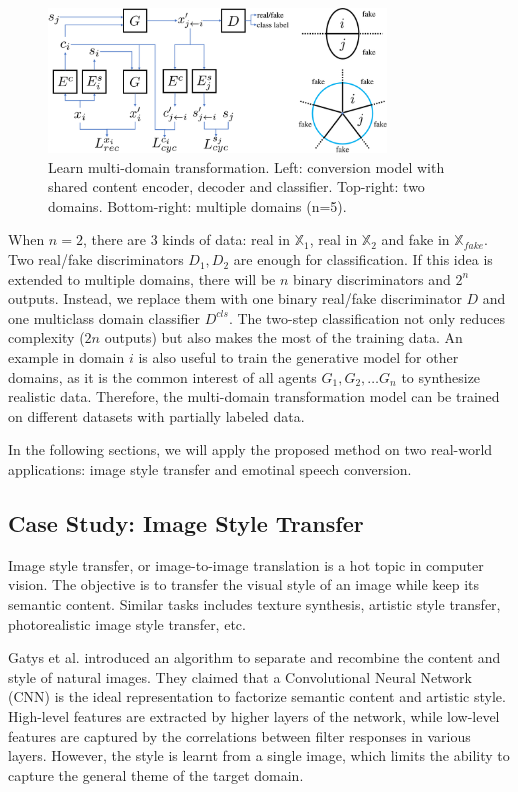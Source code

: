 \documentclass{article}
\begin{document}
\begin{figure}[htb]
\center
\includegraphics[width=0.8\textwidth]{FIG/multi}
\caption{Learn multi-domain transformation. Left: conversion model with shared content encoder, decoder and classifier. Top-right: two domains. Bottom-right: multiple domains (n=5).}
\label{fig:multi}
\end{figure}

When $n=2$, there are 3 kinds of data: real in $\mathbb{X}_1$, real in $\mathbb{X}_2$ and fake in $\mathbb{X}_{fake}$. Two real/fake discriminators $D_1,D_2$ are enough for classification.
If this idea is extended to multiple domains, there will be $n$ binary discriminators and $2^n$ outputs. Instead, we replace them with one binary real/fake discriminator $D$ and one multiclass domain classifier $D^{cls}$. The two-step classification not only reduces complexity ($2n$ outputs) but also makes the most of the training data. An example in domain $i$ is also useful to train the generative model for other domains, as it is the common interest of all agents $G_1, G_2, \ldots G_n$ to synthesize realistic data. Therefore, the multi-domain transformation model can be trained on different datasets with partially labeled data.

In the following sections, we will apply the proposed method on two real-world applications: image style transfer and emotinal speech conversion.


\subsection{Case Study: Image Style Transfer}
Image style transfer, or image-to-image translation is a hot topic in computer vision. The objective is to transfer the visual style of an image while keep its semantic content. Similar tasks includes texture synthesis, artistic style transfer, photorealistic image style transfer, etc.

Gatys et al. \cite{gatys2016image} introduced an algorithm to separate and recombine the content and style of natural images. They claimed that a Convolutional Neural Network (CNN) is the ideal representation to factorize semantic content and artistic style. High-level features are extracted by higher layers of the network, while low-level features are captured by the correlations between filter responses in various layers. However, the style is learnt from a single image, which limits the ability to capture the general theme of the target domain.
\end{document}

